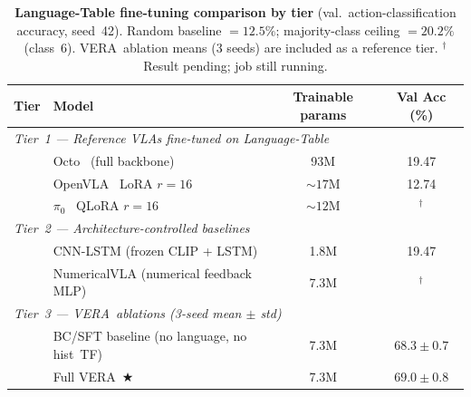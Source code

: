 \documentclass{article}
\renewcommand{\arraystretch}{1.25}
\newcommand{\modelname}{\textsc{VERA}\xspace}
\begin{document}
\begin{table}[h]
\centering
\caption{\textbf{Language-Table fine-tuning comparison by tier}
  (val.\ action-classification accuracy, seed~42).
  Random baseline $= 12.5\%$; majority-class ceiling $= 20.2\%$ (class~6).
  \modelname\ ablation means (3 seeds) are included as a reference tier.
  $^{\dagger}$Result pending; job still running.}
\label{tab:lt_finetune}
\small
\setlength{\tabcolsep}{5pt}
\renewcommand{\arraystretch}{1.15}
\begin{tabular}{llcc}
\toprule
\textbf{Tier} & \textbf{Model} & \textbf{Trainable params} & \textbf{Val Acc (\%)} \\
\midrule
\multicolumn{4}{l}{\textit{Tier~1 — Reference VLAs fine-tuned on Language-Table}} \\
& Octo~\citep{octo2024} (full backbone) & 93M & 19.47 \\
& OpenVLA~\citep{kim2024openvla} LoRA $r{=}16$ & ${\sim}17$M & 12.74 \\
& $\pi_0$~\citep{black2024pi0} QLoRA $r{=}16$ & ${\sim}12$M & $^\dagger$ \\
\midrule
\multicolumn{4}{l}{\textit{Tier~2 — Architecture-controlled baselines}} \\
& CNN-LSTM (frozen CLIP + LSTM)         & 1.8M  & 19.47 \\
& NumericalVLA (numerical feedback MLP) & 7.3M  & $^\dagger$ \\
\midrule
\multicolumn{4}{l}{\textit{Tier~3 — \modelname\ ablations (3-seed mean $\pm$ std)}} \\
& BC/SFT baseline (no language, no hist~TF) & 7.3M & $68.3 \pm 0.7$ \\
& Full \modelname\ ★                         & 7.3M & $\mathbf{69.0 \pm 0.8}$ \\
\bottomrule
\end{tabular}
\end{table}
\end{document}
